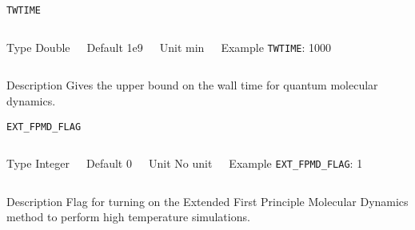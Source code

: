 \begin{frame}[allowframebreaks]{\texttt{TWTIME}} \label{TWTIME}
\vspace*{-12pt}
\begin{columns}
\begin{block}{Type}
Double
\end{block}

\begin{block}{Default}
1e9
\end{block}

\begin{block}{Unit}
min
\end{block}

\begin{block}{Example}
\texttt{TWTIME}: 1000
\end{block}
\end{columns}

\begin{block}{Description}
Gives the upper bound on the wall time for quantum molecular dynamics.
\end{block}

\end{frame}



\begin{frame}[allowframebreaks]{\texttt{EXT\_FPMD\_FLAG}} \label{EXT_FPMD_FLAG}
\vspace*{-12pt}
\begin{columns}
\begin{block}{Type}
Integer
\end{block}

\begin{block}{Default}
0
\end{block}

\begin{block}{Unit}
No unit
\end{block}

\begin{block}{Example}
\texttt{EXT\_FPMD\_FLAG}: 1
\end{block}
\end{columns}

\begin{block}{Description}
Flag for turning on the Extended First Principle Molecular Dynamics method to perform high temperature simulations.
\end{block}

\end{frame}


